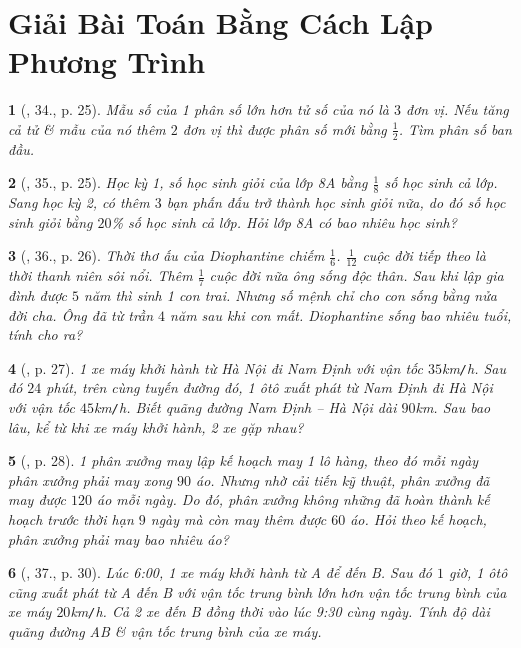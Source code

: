 \documentclass{article}
\newtheorem{baitoan}{}
\begin{document}
\section{Giải Bài Toán Bằng Cách Lập Phương Trình}

\begin{baitoan}[\cite{SGK_Toan_8_tap_2}, 34., p. 25]
	Mẫu số của 1 phân số lớn hơn tử số của nó là $3$ đơn vị. Nếu tăng cả tử \& mẫu của nó thêm $2$ đơn vị thì được phân số mới bằng $\frac{1}{2}$. Tìm phân số ban đầu.
\end{baitoan}

\begin{baitoan}[\cite{SGK_Toan_8_tap_2}, 35., p. 25]
	Học kỳ 1, số học sinh giỏi của lớp 8A bằng $\frac{1}{8}$ số học sinh cả lớp. Sang học kỳ 2, có thêm $3$ bạn phấn đấu trở thành học sinh giỏi nữa, do đó số học sinh giỏi bằng $20$\% số học sinh cả lớp. Hỏi lớp 8A có bao nhiêu học sinh?
\end{baitoan}

\begin{baitoan}[\cite{SGK_Toan_8_tap_2}, 36., p. 26]
	Thời thơ ấu của Diophantine chiếm $\frac{1}{6}$. $\frac{1}{12}$ cuộc đời tiếp theo là thời thanh niên sôi nổi. Thêm $\frac{1}{7}$ cuộc đời nữa ông sống độc thân. Sau khi lập gia đình được $5$ năm thì sinh 1 con trai. Nhưng số mệnh chỉ cho con sống bằng nửa đời cha. Ông đã từ trần $4$ năm sau khi con mất. Diophantine sống bao nhiêu tuổi, tính cho ra?
\end{baitoan}

\begin{baitoan}[\cite{SGK_Toan_8_tap_2}, p. 27]
	1 xe máy khởi hành từ Hà Nội đi Nam Định với vận tốc $35$\emph{km\texttt{/}h}. Sau đó $24$ phút, trên cùng tuyến đường đó, 1 ôtô xuất phát từ Nam Định đi Hà Nội với vận tốc $45$\emph{km\texttt{/}h}. Biết quãng đường Nam Định -- Hà Nội dài $90$\emph{km}. Sau bao lâu, kể từ khi xe máy khởi hành, 2 xe gặp nhau?
\end{baitoan}

\begin{baitoan}[\cite{SGK_Toan_8_tap_2}, p. 28]
	1 phân xưởng may lập kế hoạch may 1 lô hàng, theo đó mỗi ngày phân xưởng phải may xong $90$ áo. Nhưng nhờ cải tiến kỹ thuật, phân xưởng đã may được $120$ áo mỗi ngày. Do đó, phân xưởng không những đã hoàn thành kế hoạch trước thời hạn $9$ ngày mà còn may thêm được $60$ áo. Hỏi theo kế hoạch, phân xưởng phải may bao nhiêu áo?
\end{baitoan}

\begin{baitoan}[\cite{SGK_Toan_8_tap_2}, 37., p. 30]
	Lúc 6:00, 1 xe máy khởi hành từ A để đến B. Sau đó $1$ giờ, 1 ôtô cũng xuất phát từ A đến B với vận tốc trung bình lớn hơn vận tốc trung bình của xe máy $20$\emph{km\texttt{/}h}. Cả 2 xe đến B đồng thời vào lúc 9:30 cùng ngày. Tính độ dài quãng đường AB \& vận tốc trung bình của xe máy.
\end{baitoan}
\end{document}
